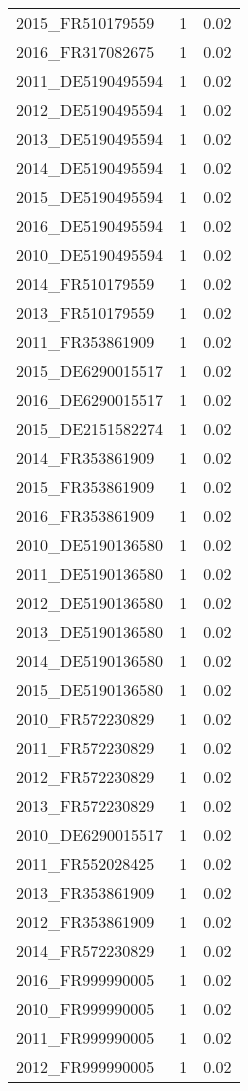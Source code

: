 \begin{table*}[htbp]
\begin{tabular}{lrr}
2015_FR510179559 & 1 & 0.02 \\
2016_FR317082675 & 1 & 0.02 \\
2011_DE5190495594 & 1 & 0.02 \\
2012_DE5190495594 & 1 & 0.02 \\
2013_DE5190495594 & 1 & 0.02 \\
2014_DE5190495594 & 1 & 0.02 \\
2015_DE5190495594 & 1 & 0.02 \\
2016_DE5190495594 & 1 & 0.02 \\
2010_DE5190495594 & 1 & 0.02 \\
2014_FR510179559 & 1 & 0.02 \\
2013_FR510179559 & 1 & 0.02 \\
2011_FR353861909 & 1 & 0.02 \\
2015_DE6290015517 & 1 & 0.02 \\
2016_DE6290015517 & 1 & 0.02 \\
2015_DE2151582274 & 1 & 0.02 \\
2014_FR353861909 & 1 & 0.02 \\
2015_FR353861909 & 1 & 0.02 \\
2016_FR353861909 & 1 & 0.02 \\
2010_DE5190136580 & 1 & 0.02 \\
2011_DE5190136580 & 1 & 0.02 \\
2012_DE5190136580 & 1 & 0.02 \\
2013_DE5190136580 & 1 & 0.02 \\
2014_DE5190136580 & 1 & 0.02 \\
2015_DE5190136580 & 1 & 0.02 \\
2010_FR572230829 & 1 & 0.02 \\
2011_FR572230829 & 1 & 0.02 \\
2012_FR572230829 & 1 & 0.02 \\
2013_FR572230829 & 1 & 0.02 \\
2010_DE6290015517 & 1 & 0.02 \\
2011_FR552028425 & 1 & 0.02 \\
2013_FR353861909 & 1 & 0.02 \\
2012_FR353861909 & 1 & 0.02 \\
2014_FR572230829 & 1 & 0.02 \\
2016_FR999990005 & 1 & 0.02 \\
2010_FR999990005 & 1 & 0.02 \\
2011_FR999990005 & 1 & 0.02 \\
2012_FR999990005 & 1 & 0.02 \\

\end{tabular}
\end{table*}
